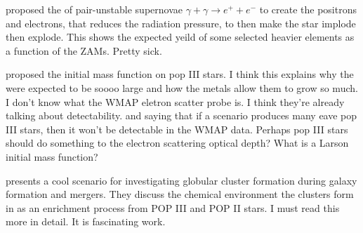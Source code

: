     \citet{2002ApJ...571...30S} proposed the of pair-unstable supernovae $\gamma + \gamma \rightarrow e^{+} + e^{-}$ to create the positrons and electrons, that reduces the radiation pressure, to then make the star implode then explode. This shows the expected yeild of some selected heavier elements as a function of the ZAMs. Pretty sick. 
    
    \citet{2006MNRAS.369..825S} proposed the initial mass function on pop III stars. I think this explains why the were expected to be soooo large and how the metals allow them to grow so much. I don't know what the  WMAP eletron scatter probe is. I think they're already talking about detectability. and saying that if a scenario produces many eave pop III stars, then it won't be detectable in the WMAP data. Perhaps pop III stars should do something to the electron scattering optical depth? What is a Larson initial mass function?  

    \citet{2025MNRAS.540.1235C} presents a cool scenario for investigating globular cluster formation during galaxy formation and mergers. They discuss the chemical environment the clusters form in as an enrichment process from POP III and POP II stars. I must read this more in detail. It is fascinating work. 







